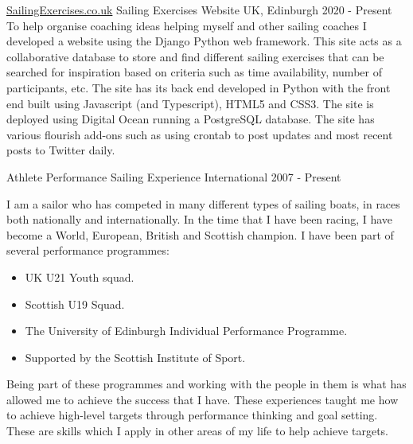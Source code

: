 


\begin{cventries}

    \cventry
        {\href{www.sailingexercises.co.uk}{SailingExercises.co.uk}}
        {Sailing Exercises Website}
        {UK, Edinburgh}
        {2020 - Present}
        {
        To help organise coaching ideas helping myself and other sailing coaches I developed a website using the Django Python web framework. This site acts as a collaborative database to store and find different sailing exercises that can be searched for inspiration based on criteria such as time availability, number of participants, etc. The site has its back end developed in Python with the front end built using Javascript (and Typescript), HTML5 and CSS3. The site is deployed using Digital Ocean running a PostgreSQL database. The site has various flourish add-ons such as using crontab to post updates and most recent posts to Twitter daily.\newline
        }
    
  \cventry
    {Athlete} %
    {Performance Sailing Experience} %
    {International} %
    {2007 - Present} %
    {
      I am a sailor who has competed in many different types of sailing boats, in races both nationally and internationally. In the time that I have been racing, I have become a World, European, British and Scottish champion. I have been part of several performance programmes:
      \begin{itemize}
          \item UK U21 Youth squad.
          \item Scottish U19 Squad.
          \item The University of Edinburgh Individual Performance Programme.
          \item Supported by the Scottish Institute of Sport.
      \end{itemize}
      Being part of these programmes and working with the people in them is what has allowed me to achieve the success that I have. These experiences taught me how to achieve high-level targets through performance thinking and goal setting. These are skills which I apply in other areas of my life to help achieve targets. 
    }


\end{cventries}
